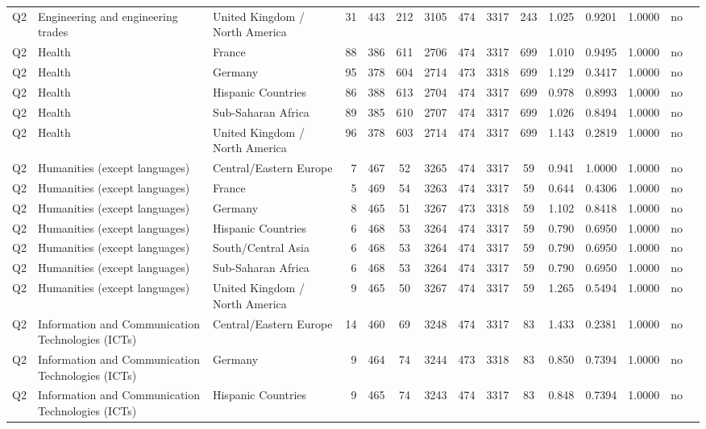 \begin{longtable}{lllrcccccccccll}
Q2 & Engineering and engineering trades & United Kingdom / North America & 31 & 443 & 212 & 3105 & 474 & 3317 & 243 & 1.025 & 0.9201 & 1.0000 & no \\
Q2 & Health & France & 88 & 386 & 611 & 2706 & 474 & 3317 & 699 & 1.010 & 0.9495 & 1.0000 & no \\
Q2 & Health & Germany & 95 & 378 & 604 & 2714 & 473 & 3318 & 699 & 1.129 & 0.3417 & 1.0000 & no \\
Q2 & Health & Hispanic Countries & 86 & 388 & 613 & 2704 & 474 & 3317 & 699 & 0.978 & 0.8993 & 1.0000 & no \\
Q2 & Health & Sub-Saharan Africa & 89 & 385 & 610 & 2707 & 474 & 3317 & 699 & 1.026 & 0.8494 & 1.0000 & no \\
Q2 & Health & United Kingdom / North America & 96 & 378 & 603 & 2714 & 474 & 3317 & 699 & 1.143 & 0.2819 & 1.0000 & no \\
Q2 & Humanities (except languages) & Central/Eastern Europe & 7 & 467 & 52 & 3265 & 474 & 3317 & 59 & 0.941 & 1.0000 & 1.0000 & no \\
Q2 & Humanities (except languages) & France & 5 & 469 & 54 & 3263 & 474 & 3317 & 59 & 0.644 & 0.4306 & 1.0000 & no \\
Q2 & Humanities (except languages) & Germany & 8 & 465 & 51 & 3267 & 473 & 3318 & 59 & 1.102 & 0.8418 & 1.0000 & no \\
Q2 & Humanities (except languages) & Hispanic Countries & 6 & 468 & 53 & 3264 & 474 & 3317 & 59 & 0.790 & 0.6950 & 1.0000 & no \\
Q2 & Humanities (except languages) & South/Central Asia & 6 & 468 & 53 & 3264 & 474 & 3317 & 59 & 0.790 & 0.6950 & 1.0000 & no \\
Q2 & Humanities (except languages) & Sub-Saharan Africa & 6 & 468 & 53 & 3264 & 474 & 3317 & 59 & 0.790 & 0.6950 & 1.0000 & no \\
Q2 & Humanities (except languages) & United Kingdom / North America & 9 & 465 & 50 & 3267 & 474 & 3317 & 59 & 1.265 & 0.5494 & 1.0000 & no \\
Q2 & Information and Communication Technologies (ICTs) & Central/Eastern Europe & 14 & 460 & 69 & 3248 & 474 & 3317 & 83 & 1.433 & 0.2381 & 1.0000 & no \\
Q2 & Information and Communication Technologies (ICTs) & Germany & 9 & 464 & 74 & 3244 & 473 & 3318 & 83 & 0.850 & 0.7394 & 1.0000 & no \\
Q2 & Information and Communication Technologies (ICTs) & Hispanic Countries & 9 & 465 & 74 & 3243 & 474 & 3317 & 83 & 0.848 & 0.7394 & 1.0000 & no \\

\end{longtable}
